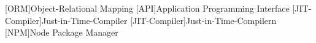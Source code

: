 [ORM]{Object-Relational Mapping}
[API]{Application Programming Interface}
[JIT-Compiler]{Just-in-Time-Compiler}
[JIT-Compiler]{Just-in-Time-Compilern}
[NPM]{Node Package Manager}